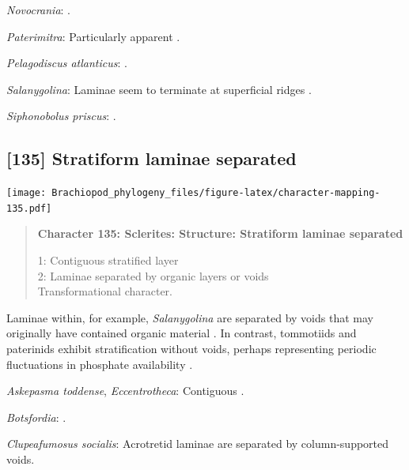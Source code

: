 \documentclass[openany]{book}
\begin{document}
\hypertarget{Novocrania-coding-134}{}
\emph{Novocrania}: \citet{Parkinson2005}.

\hypertarget{Paterimitra-coding-134}{}
\emph{Paterimitra}: Particularly apparent
\citep{Larsson2014iPaterimitra}.

\hypertarget{Pelagodiscus_atlanticus-coding-134}{}
\emph{Pelagodiscus atlanticus}: \citet{Williams1998Chemicostructural}.

\hypertarget{Salanygolina-coding-134}{}
\emph{Salanygolina}: Laminae seem to terminate at superficial ridges
\citep{Holmer2009Theenigmatic}.

\hypertarget{Siphonobolus_priscus-coding-134}{}
\emph{Siphonobolus priscus}: \citep{Williams2004Chemicostructure}.

\subsection*{{[}135{]} Stratiform laminae
separated}\label{stratiform-laminae-separated}

\texttt{[image: Brachiopod\_phylogeny\_files/figure-latex/character-mapping-135.pdf]}

\begin{quote}
\textbf{Character 135: Sclerites: Structure: Stratiform laminae
separated}

1: Contiguous stratified layer\\
2: Laminae separated by organic layers or voids\\
Transformational character.
\end{quote}

Laminae within, for example, \emph{Salanygolina} are separated by voids
that may originally have contained organic material
\citep[e.g.][]{Holmer2009Theenigmatic}. In contrast, tommotiids and
paterinids exhibit stratification without voids, perhaps representing
periodic fluctuations in phosphate availability
\citep{Balthasar2009Homologousskeletal}.

\hypertarget{Askepasma_toddense-coding-135}{}
\emph{Askepasma toddense}, \emph{Eccentrotheca}: Contiguous
\citep{Balthasar2009Homologousskeletal}.

\hypertarget{Botsfordia-coding-135}{}
\emph{Botsfordia}: \citet{Skovsted2003EarlyCambrian}.

\hypertarget{Clupeafumosus_socialis-coding-135}{}
\emph{Clupeafumosus socialis}: Acrotretid laminae are separated by
column-supported voids.
\end{document}
